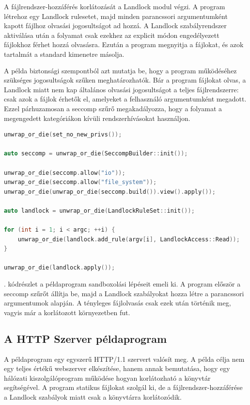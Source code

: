 A fájlrendszer-hozzáférés korlátozását a Landlock modul végzi. A program
létrehoz egy Landlock rulesetet, majd minden parancssori argumentumként kapott
fájlhoz olvasási jogosultságot ad hozzá. A Landlock szabályrendszer aktiválása
után a folyamat csak ezekhez az explicit módon engedélyezett fájlokhoz férhet
hozzá olvasásra. Ezután a program megnyitja a fájlokat, és azok tartalmát a
standard kimenetre másolja.

A példa biztonsági szempontból azt mutatja be, hogy a program működéséhez
szükséges jogosultságok szűken meghatározhatók. Bár a program fájlokat olvas, a
Landlock miatt nem kap általános olvasási jogosultságot a teljes fájlrendszerre:
csak azok a fájlok érhetők el, amelyeket a felhasználó argumentumként megadott.
Ezzel párhuzamosan a seccomp szűrő megakadályozza, hogy a folyamat a
megengedett kategóriákon kívüli rendszerhívásokat használjon.

\begin{lstlisting}[float, language=C++, caption={A \code{cat} példaprogram sandbox beállítása}, label={lst:example-cat-sandbox}]
unwrap_or_die(set_no_new_privs());

auto seccomp = unwrap_or_die(SeccompBuilder::init());

unwrap_or_die(seccomp.allow("io"));
unwrap_or_die(seccomp.allow("file_system"));
unwrap_or_die(unwrap_or_die(seccomp.build()).view().apply());

auto landlock = unwrap_or_die(LandlockRuleSet::init());

for (int i = 1; i < argc; ++i) {
    unwrap_or_die(landlock.add_rule(argv[i], LandlockAccess::Read));
}

unwrap_or_die(landlock.apply());
\end{lstlisting}

. kódrészlet a  példaprogram
sandboxolási lépéseit emeli ki. A program először a seccomp szűrőt állítja be,
majd a Landlock szabályokat hozza létre a parancssori argumentumok alapján. A
tényleges fájlolvasás csak ezek után történik meg, vagyis már a korlátozott
környezetben fut.

\subsection{A HTTP Szerver példaprogram}

A  példaprogram egy egyszerű HTTP/1.1 szervert
valósít meg. A példa célja nem egy teljes értékű webszerver elkészítése, hanem
annak bemutatása, hogy egy hálózati kiszolgálóprogram működése hogyan
korlátozható a könyvtár segítségével. A program statikus fájlokat szolgál ki,
de a fájlrendszer-hozzáférése a Landlock szabályok miatt csak a 
könyvtárra korlátozódik.

